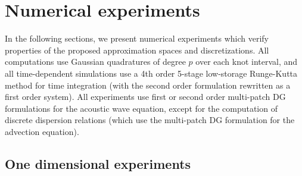 \documentclass[preprint,10pt]{elsarticle}
\newcommand{\LRp}[1]{\left( #1 \right)}
\begin{document}
{%
}

\section{Numerical experiments}
\label{sec:num}

In the following sections, we present numerical experiments which verify properties of the proposed approximation spaces and discretizations.  All computations use Gaussian quadratures of degree $p$ over each knot interval, and all time-dependent simulations use a 4th order 5-stage low-storage Runge-Kutta method for time integration \cite{carpenter1994fourth} (with the second order formulation rewritten as a first order system).  All experiments use first or second order multi-patch DG formulations for the acoustic wave equation, except for the computation of discrete dispersion relations (which use the multi-patch DG formulation for the advection equation).  

\subsection{One dimensional experiments}
\end{document}
